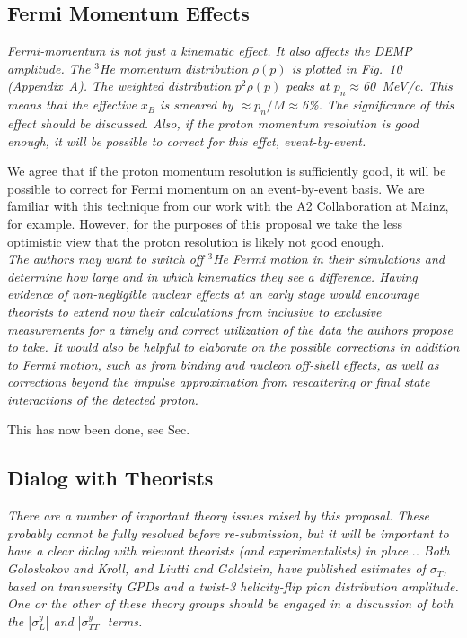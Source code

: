 \subsection{Fermi Momentum Effects}

{\it Fermi-momentum is not just a kinematic effect.  It also affects the DEMP
  amplitude.  The $^3$He momentum distribution $\rho(p)$ is plotted in Fig.~10
  (Appendix~A).  The weighted distribution $p^2\rho(p)$ peaks at
  $p_n\approx$60~MeV/c.  This means that the effective $x_B$ is smeared by
  $\approx p_n/M\approx$6\%.  The significance of this effect should be
  discussed.  Also, if the proton momentum resolution is good enough, it will
  be possible to correct for this effct, event-by-event.}

We agree that if the proton momentum resolution is sufficiently good, it will
be possible to correct for Fermi momentum on an event-by-event basis.  We are
familiar with this technique from our work with the A2 Collaboration at Mainz,
for example.  However, for the purposes of this proposal we take the
less optimistic view that the proton resolution is likely not good enough.
\\[0.2ex]

{\it The authors may want to switch off $^3$He Fermi motion in their
  simulations and determine how large and in which kinematics they see a
  difference.  Having evidence of non-negligible nuclear effects at an early
  stage would encourage theorists to extend now their calculations from
  inclusive to exclusive measurements for a timely and correct utilization of
  the data the authors propose to take.  It would also be helpful to elaborate
  on the possible corrections in addition to Fermi motion, such as from binding
  and nucleon off-shell effects, as well as corrections beyond the impulse
  approximation from rescattering or final state interactions of the detected
  proton.}

This has now been done, see Sec.

\subsection{Dialog with Theorists}

{\it There are a number of important theory issues raised by this proposal.
  These probably cannot be fully resolved before re-submission, but it will be
  important to have a clear dialog with relevant theorists (and
  experimentalists) in place...  Both Goloskokov and Kroll, and Liutti and
  Goldstein, have published estimates of $\sigma_T$, based on transversity GPDs
  and a twist-3 helicity-flip pion distribution amplitude.  One or the other of
  these theory groups should be engaged in a discussion of both the
  $|\sigma^y_L|$ and $|\sigma^y_{TT}|$ terms.}

